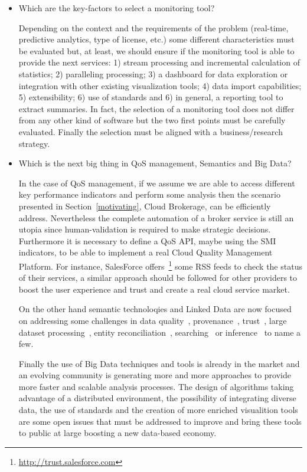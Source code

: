 \begin{itemize}
\item Which are the key-factors to select a monitoring tool?


Depending on the context and the requirements of the problem (real-time, predictive analytics, type of license, etc.) 
some different characteristics must be evaluated but, at least, we should ensure if the monitoring tool 
is able to provide the next services: 1) stream processing and incremental calculation of statistics; 
2) paralleling processing; 3) a dashboard for data exploration or integration with other 
existing visualization tools; 4) data import capabilities; 5) extensibility; 6) use of standards and 6) in general, 
a reporting tool to extract summaries. In fact, the selection of a monitoring tool does not differ from 
any other kind of software but the two first points must be carefully evaluated. Finally the selection 
must be aligned with a business/research strategy.


\item Which is the next big thing in QoS management, Semantics and Big Data?

In the case of QoS management, if we assume we are able to access different key performance indicators and perform 
some analysis then the scenario presented in Section~\ref{motivating}, Cloud Brokerage, can 
be efficiently address. Nevertheless the complete automation of a broker service is still 
an utopia since human-validation is required to make strategic decisions. Furthermore it is necessary 
to define a QoS API, maybe using the SMI indicators, to be able to implement a real Cloud Quality Management 
Platform. For instance, SalesForce offers~\footnote{\url{http://trust.salesforce.com}} 
some RSS feeds to check the status of their services, a similar approach should be followed for other providers to boost 
the user experience and trust and create a real cloud service market.

On the other hand semantic technoloqies and Linked Data are now focused on addressing some challenges in
data quality~\cite{bizer2007,Bizer2009QA,lodq,link-qa}, provenance~\cite{DBLP:conf/ipaw/HartigZ10}, trust~\cite{Carroll05namedgraphs}, 
large dataset processing~\cite{DBLP:conf/closer/HausenblasGHC12}, entity reconciliation~\cite{Maali_Cyganiak_2011}, 
searching~\cite{hoga-etal-2011-swse-JWS} or inference~\cite{DBLP:journals/ws/BonattiHPS11} to name a few.

Finally the use of Big Data techniques and tools is already in the market and an evolving community is generating 
more and more approaches to provide more faster and scalable analysis processes. The design of algorithms taking 
advantage of a distributed environment, the possibility of integrating diverse data, the use of standards and the creation 
of more enriched visualition tools are some open issues that must be addressed to improve and bring these tools 
to public at large boosting a new data-based economy.


\end{itemize}







